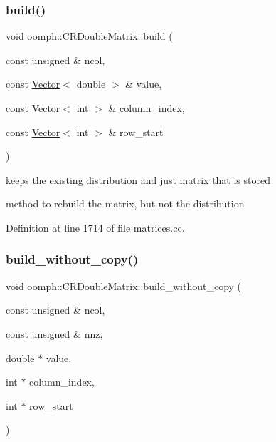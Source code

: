 \subsubsection{\texorpdfstring{build()}{build()}\hspace{0.1cm}{\footnotesize\ttfamily [3/3]}}
{\footnotesize\ttfamily void oomph\+::\+C\+R\+Double\+Matrix\+::build (\begin{DoxyParamCaption}\item[{const unsigned \&}]{ncol,  }\item[{const \hyperlink{classoomph_1_1Vector}{Vector}$<$ double $>$ \&}]{value,  }\item[{const \hyperlink{classoomph_1_1Vector}{Vector}$<$ int $>$ \&}]{column\+\_\+index,  }\item[{const \hyperlink{classoomph_1_1Vector}{Vector}$<$ int $>$ \&}]{row\+\_\+start }\end{DoxyParamCaption})}



keeps the existing distribution and just matrix that is stored 

method to rebuild the matrix, but not the distribution 

Definition at line 1714 of file matrices.\+cc.

\mbox{\label{classoomph_1_1CRDoubleMatrix_aafb4d7de0a87b4bda560928e6a128060}} 
\subsubsection{\texorpdfstring{build\+\_\+without\+\_\+copy()}{build\_without\_copy()}}
{\footnotesize\ttfamily void oomph\+::\+C\+R\+Double\+Matrix\+::build\+\_\+without\+\_\+copy (\begin{DoxyParamCaption}\item[{const unsigned \&}]{ncol,  }\item[{const unsigned \&}]{nnz,  }\item[{double $\ast$}]{value,  }\item[{int $\ast$}]{column\+\_\+index,  }\item[{int $\ast$}]{row\+\_\+start }\end{DoxyParamCaption})}



